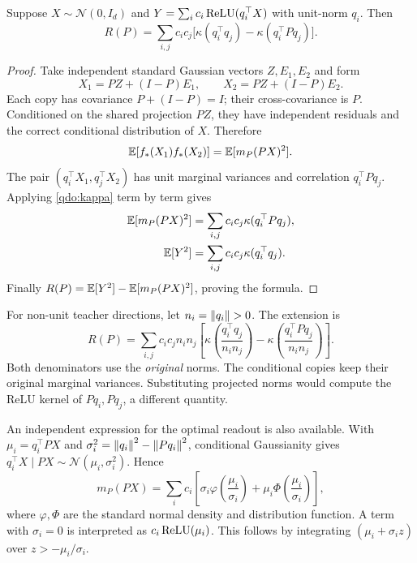 \begin{proposition}
\label{qdo:floorformula}
Suppose $X\sim\mathcal N(0,I_d)$ and
$Y=\sum_i c_i\operatorname{ReLU}(q_i^\top X)$ with unit-norm $q_i$.
Then
\begin{equation}
 \boxed{\displaystyle
 R(P)=\sum_{i,j}c_i c_j
 \bigl[\kappa(q_i^\top q_j)-\kappa(q_i^\top Pq_j)\bigr].}
 \label{qdo:exactfloor}
\end{equation}
\end{proposition}

\begin{proof}
Take independent standard Gaussian vectors $Z,E_1,E_2$ and form
\begin{equation}
 X_1=PZ+(I-P)E_1,\qquad X_2=PZ+(I-P)E_2.
 \label{qdo:copies}
\end{equation}
Each copy has covariance $P+(I-P)=I$; their cross-covariance is $P$.
Conditioned on the shared projection $PZ$, they have independent residuals
and the correct conditional distribution of $X$. Therefore
\begin{equation}
 \mathbb E[f_*(X_1)f_*(X_2)]=\mathbb E[m_P(PX)^2].
 \label{qdo:copymoment}
\end{equation}
The pair $(q_i^\top X_1,q_j^\top X_2)$ has unit marginal variances and
correlation $q_i^\top Pq_j$. Applying \eqref{qdo:kappa} term by term gives
\begin{align}
 \mathbb E[m_P(PX)^2]&=\sum_{i,j}c_i c_j\kappa(q_i^\top Pq_j),\\
 \mathbb E[Y^2]&=\sum_{i,j}c_i c_j\kappa(q_i^\top q_j).
 \label{qdo:twomoments}
\end{align}
Finally $R(P)=\mathbb E[Y^2]-\mathbb E[m_P(PX)^2]$, proving the formula.
\end{proof}

For non-unit teacher directions, let $n_i=\left\lVert q_i\right\rVert>0$. The extension is
\begin{equation}
 R(P)=\sum_{i,j}c_i c_j n_i n_j
 \left[
 \kappa\!\left(\frac{q_i^\top q_j}{n_i n_j}\right)
 -\kappa\!\left(\frac{q_i^\top Pq_j}{n_i n_j}\right)
 \right].
 \label{qdo:nonunitfloor}
\end{equation}
Both denominators use the \emph{original} norms. The conditional copies keep
their original marginal variances. Substituting projected norms would compute
the ReLU kernel of $Pq_i,Pq_j$, a different quantity.

An independent expression for the optimal readout is also available. With
$\mu_i=q_i^\top PX$ and $\sigma_i^2=\left\lVert q_i\right\rVert^2-\left\lVert Pq_i\right\rVert^2$, conditional
Gaussianity gives $q_i^\top X\mid PX\sim\mathcal N(\mu_i,\sigma_i^2)$. Hence
\begin{equation}
 m_P(PX)=\sum_i c_i
 \left[
 \sigma_i\varphi\!\left(\frac{\mu_i}{\sigma_i}\right)
 +\mu_i\Phi\!\left(\frac{\mu_i}{\sigma_i}\right)
 \right],
 \label{qdo:conditionalmean}
\end{equation}
where $\varphi,\Phi$ are the standard normal density and distribution
function. A term with $\sigma_i=0$ is interpreted as
$c_i\operatorname{ReLU}(\mu_i)$. This follows by integrating
$(\mu_i+\sigma_i z)$ over $z>-\mu_i/\sigma_i$.

